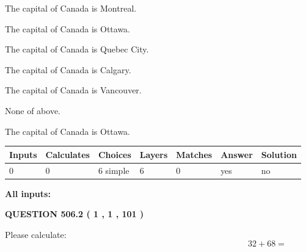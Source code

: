 \documentclass[12pt]{article}
\begin{document}
 
The capital of Canada is Montreal.
 
 
The capital of Canada is Ottawa.
 
 
The capital of Canada is Quebec City.
 
 
The capital of Canada is Calgary.
 
 
The capital of Canada is Vancouver.
 
 
 None of above.
 
 
\noindent{}
 
 
The capital of Canada is Ottawa.
 
 
\noindent{}
 
 
   
   
   
   
\noindent\begin{tabular}{|l|l|l|l|l|l|l|}
 \hline
Inputs & Calculates & Choices & Layers & Matches & Answer & Solution \\ \hline
 0  & 
 0  & 
 6
  simple  
  & 
 6  & 
 0  & 
  yes & 
  no 
  \\ \hline
 \end{tabular}
   
   
   
   
\noindent{}
   
   
   
   
\noindent\vspace{0.1in}\hspace{-0.08in} {\textbf{\Large{All inputs: }}}
   
   
  
\vspace{0.2in}
  
{\textbf{\Large{QUESTION
506.2 
 ( 1 , 1 , 101 )
}}}
  
  
 
Please calculate:
\begin{equation}
32 +  %
68 = \nonumber
\end{equation}
 
 
 
\noindent{}
 
\end{document}
